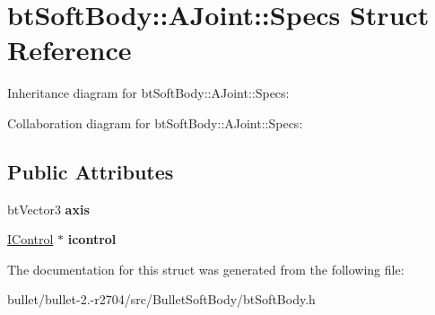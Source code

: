 \hypertarget{structbt_soft_body_1_1_a_joint_1_1_specs}{\section{bt\+Soft\+Body\+:\+:A\+Joint\+:\+:Specs Struct Reference}
\label{structbt_soft_body_1_1_a_joint_1_1_specs}
}


Inheritance diagram for bt\+Soft\+Body\+:\+:A\+Joint\+:\+:Specs\+:


Collaboration diagram for bt\+Soft\+Body\+:\+:A\+Joint\+:\+:Specs\+:
\subsection*{Public Attributes}
\begin{DoxyCompactItemize}
\item 
\hypertarget{structbt_soft_body_1_1_a_joint_1_1_specs_ae043ee7fa63bf1cc3f35e89fa622a0cd}{bt\+Vector3 {\bfseries axis}}\label{structbt_soft_body_1_1_a_joint_1_1_specs_ae043ee7fa63bf1cc3f35e89fa622a0cd}

\item 
\hypertarget{structbt_soft_body_1_1_a_joint_1_1_specs_a1bc2eafb69ff1eb116ebbb0f5ad976e7}{\hyperlink{structbt_soft_body_1_1_a_joint_1_1_i_control}{I\+Control} $\ast$ {\bfseries icontrol}}\label{structbt_soft_body_1_1_a_joint_1_1_specs_a1bc2eafb69ff1eb116ebbb0f5ad976e7}

\end{DoxyCompactItemize}


The documentation for this struct was generated from the following file\+:\begin{DoxyCompactItemize}
\item 
bullet/bullet-\/2.-\/r2704/src/\+Bullet\+Soft\+Body/bt\+Soft\+Body.\+h\end{DoxyCompactItemize}
